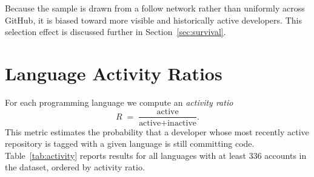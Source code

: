 \documentclass[12pt,a4paper]{article}
\begin{document}
Because the sample is drawn from a follow network rather than uniformly across
GitHub, it is biased toward more visible and historically active developers.
This selection effect is discussed further in Section~\ref{sec:survival}.

\section{Language Activity Ratios}

For each programming language we compute an \emph{activity ratio}
\[
R \;=\; \frac{\text{active}}{\text{active}+\text{inactive}}.
\]
This metric estimates the probability that a developer whose most recently
active repository is tagged with a given language is still committing code.
Table~\ref{tab:activity} reports results for all languages with at least 336
accounts in the dataset, ordered by activity ratio.
\end{document}
